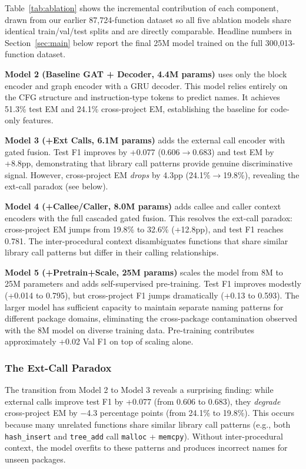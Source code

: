 \documentclass[sigconf,nonacm]{acmart}
\begin{document}
Table~\ref{tab:ablation} shows the incremental contribution of each component, drawn from our earlier 87,724-function dataset so all five ablation models share identical train/val/test splits and are directly comparable. Headline numbers in Section~\ref{sec:main} below report the final 25M model trained on the full 300,013-function dataset.

\textbf{Model 2 (Baseline GAT + Decoder, 4.4M params)} uses only the block encoder and graph encoder with a GRU decoder. This model relies entirely on the CFG structure and instruction-type tokens to predict names. It achieves 51.3\% test EM and 24.1\% cross-project EM, establishing the baseline for code-only features.

\textbf{Model 3 (+Ext Calls, 6.1M params)} adds the external call encoder with gated fusion. Test F1 improves by +0.077 (0.606$\to$0.683) and test EM by +8.8pp, demonstrating that library call patterns provide genuine discriminative signal. However, cross-project EM \emph{drops} by 4.3pp (24.1\%$\to$19.8\%), revealing the ext-call paradox (see below).

\textbf{Model 4 (+Callee/Caller, 8.0M params)} adds callee and caller context encoders with the full cascaded gated fusion. This resolves the ext-call paradox: cross-project EM jumps from 19.8\% to 32.6\% (+12.8pp), and test F1 reaches 0.781. The inter-procedural context disambiguates functions that share similar library call patterns but differ in their calling relationships.

\textbf{Model 5 (+Pretrain+Scale, 25M params)} scales the model from 8M to 25M parameters and adds self-supervised pre-training. Test F1 improves modestly (+0.014 to 0.795), but cross-project F1 jumps dramatically (+0.13 to 0.593). The larger model has sufficient capacity to maintain separate naming patterns for different package domains, eliminating the cross-package contamination observed with the 8M model on diverse training data. Pre-training contributes approximately +0.02 Val F1 on top of scaling alone.

\subsubsection{The Ext-Call Paradox}
The transition from Model 2 to Model 3 reveals a surprising finding: while external calls improve test F1 by +0.077 (from 0.606 to 0.683), they \emph{degrade} cross-project EM by $-$4.3 percentage points (from 24.1\% to 19.8\%). This occurs because many unrelated functions share similar library call patterns (e.g., both \texttt{hash\_insert} and \texttt{tree\_add} call \texttt{malloc} + \texttt{memcpy}). Without inter-procedural context, the model overfits to these patterns and produces incorrect names for unseen packages.
\end{document}

